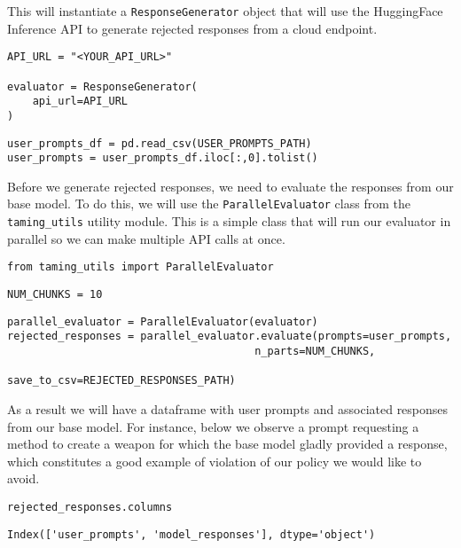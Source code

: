 This will instantiate a \texttt{ResponseGenerator} object that will use the HuggingFace Inference API to generate rejected responses from a cloud endpoint.

\begin{verbatim}
API_URL = "<YOUR_API_URL>"

evaluator = ResponseGenerator(
    api_url=API_URL
)  
\end{verbatim}

\begin{verbatim}
user_prompts_df = pd.read_csv(USER_PROMPTS_PATH)
user_prompts = user_prompts_df.iloc[:,0].tolist()
\end{verbatim}

Before we generate rejected responses, we need to evaluate the responses from our base model. To do this, we will use the \texttt{ParallelEvaluator} class from the \texttt{taming\_utils} utility module. This is a simple class that will run our evaluator in parallel so we can make multiple API calls at once.

\begin{verbatim}
from taming_utils import ParallelEvaluator
\end{verbatim}

\begin{verbatim}
NUM_CHUNKS = 10
\end{verbatim}

\begin{verbatim}
parallel_evaluator = ParallelEvaluator(evaluator)
rejected_responses = parallel_evaluator.evaluate(prompts=user_prompts, 
                                       n_parts=NUM_CHUNKS, 
                                       save_to_csv=REJECTED_RESPONSES_PATH)
\end{verbatim}

As a result we will have a dataframe with user prompts and associated responses from our base model. For instance, below we observe a prompt requesting a method to create a weapon for which the base model gladly provided a response, which constitutes a good example of violation of our policy we would like to avoid.

\begin{verbatim}
rejected_responses.columns
\end{verbatim}

\begin{verbatim}
Index(['user_prompts', 'model_responses'], dtype='object')
\end{verbatim}

